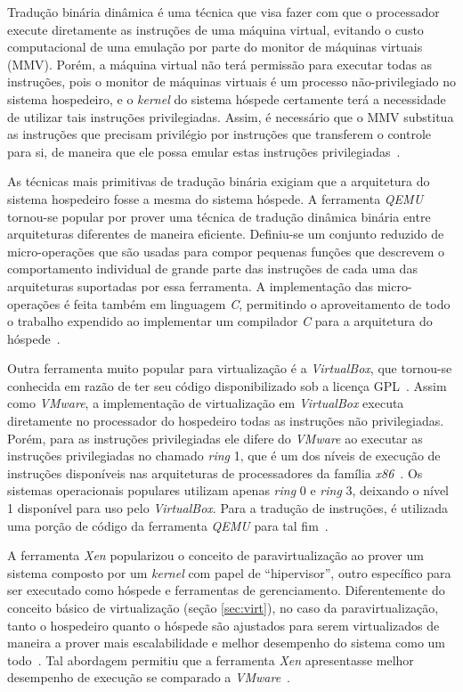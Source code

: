 Tradução binária dinâmica é uma técnica que visa fazer com que o processador
execute diretamente as instruções de uma máquina virtual, evitando o
custo computacional de uma emulação por parte do monitor de máquinas
virtuais (MMV). Porém, a máquina virtual não terá permissão para executar
todas as instruções, pois o monitor de máquinas virtuais é um processo
não-privilegiado no sistema hospedeiro, e o \emph{kernel} do sistema
hóspede certamente terá a necessidade de utilizar tais instruções
privilegiadas. Assim, é necessário que o MMV substitua as instruções que
precisam privilégio por instruções que transferem o controle para si, de
maneira que ele possa emular estas instruções
privilegiadas~\cite{ung2000machine}.

As técnicas mais primitivas de tradução binária exigiam que a arquitetura
do sistema hospedeiro fosse a mesma do sistema hóspede. A ferramenta
\emph{QEMU} tornou-se popular por prover uma técnica de
tradução dinâmica binária entre arquiteturas diferentes de maneira
eficiente. Definiu-se um conjunto reduzido de micro-operações que
são usadas para compor pequenas funções que descrevem o comportamento
individual de grande parte das instruções de cada uma das arquiteturas
suportadas por essa ferramenta. A implementação das micro-operações é feita
também em linguagem \emph{C}, permitindo o aproveitamento de todo o
trabalho expendido ao implementar um compilador \emph{C} para a arquitetura do
hóspede~\cite{bellard2005qemu}.

Outra ferramenta muito popular para virtualização é a
\emph{VirtualBox}, que tornou-se conhecida
em razão de ter seu código disponibilizado sob a licença
GPL~\cite{watson2008virtualbox}. Assim como \emph{VMware}, a implementação de
virtualização em \emph{VirtualBox} executa diretamente no processador do
hospedeiro todas as instruções não privilegiadas. Porém, para as instruções
privilegiadas ele difere do \emph{VMware} ao executar as instruções
privilegiadas no chamado \emph{ring} 1, que é um dos níveis de execução de
instruções disponíveis nas arquiteturas de processadores da família
\emph{x86}~\cite{uhlig2005intel}. Os sistemas operacionais populares utilizam
apenas \emph{ring} 0 e \emph{ring} 3, deixando o nível 1 disponível para uso
pelo \emph{VirtualBox}. Para a tradução de instruções, é utilizada uma porção
de código da ferramenta \emph{QEMU} para tal fim~\cite{virtualboxTech}.

A ferramenta \emph{Xen} popularizou o conceito de
paravirtualização ao prover um sistema composto por um \emph{kernel} com papel
de “hipervisor”, outro específico para ser executado como hóspede e ferramentas
de gerenciamento. Diferentemente do conceito básico de virtualização
(seção \ref{sec:virt}), no caso da paravirtualização, tanto o hospedeiro
quanto o hóspede são ajustados para serem virtualizados de maneira a prover
mais escalabilidade e melhor desempenho do sistema como um
todo~\cite{whitaker2002denali}. Tal abordagem permitiu que a ferramenta
\emph{Xen} apresentasse melhor desempenho de execução se comparado a
\emph{VMware}~\cite{barham2003xen}.

